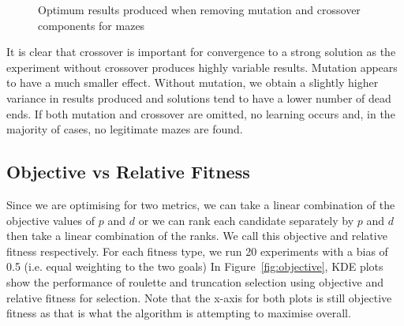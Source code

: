 \begin{figure}[!h]
\centering
            \hfill
            \hfill
            \hfill
            \caption{Optimum results produced when removing mutation and crossover components for mazes}
\label{fig:maze-ablation}
\end{figure}

It is clear that crossover is important for convergence to a strong solution as the experiment without crossover produces highly variable results. Mutation appears to have a much smaller effect. Without mutation, we obtain a slightly higher variance in results produced and solutions tend to have a lower number of dead ends. If both mutation and crossover are omitted, no learning occurs and, in the majority of cases, no legitimate mazes are found.

\subsection{Objective vs Relative Fitness}

Since we are optimising for two metrics, we can take a linear combination of the objective values of $p$ and $d$ or we can rank each candidate separately by $p$ and $d$ then take a linear combination of the ranks. We call this objective and relative fitness respectively. For each fitness type, we run 20 experiments with a bias of 0.5 (i.e. equal weighting to the two goals) In Figure~\ref{fig:objective}, KDE plots show the performance of roulette and truncation selection using objective and relative fitness for selection. Note that the x-axis for both plots is still objective fitness as that is what the algorithm is attempting to maximise overall.

